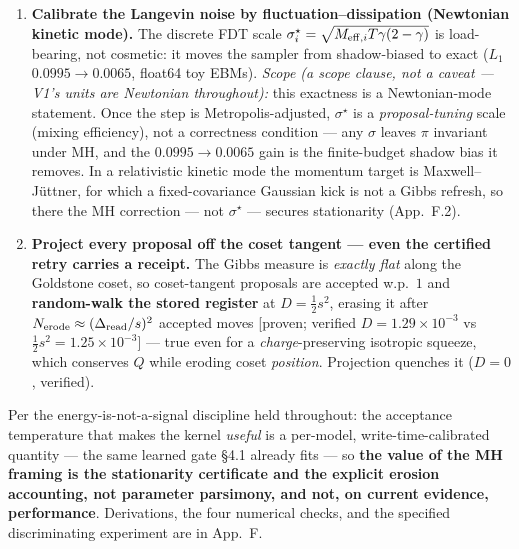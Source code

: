 \documentclass[11pt]{article}
\begin{document}
\begin{enumerate}
\item \textbf{Calibrate the Langevin noise by fluctuation--dissipation (Newtonian kinetic mode).} The discrete FDT scale $\sigma_i^\star=\sqrt{M_{{\rm eff},i}T\gamma(2-\gamma)}$ is load-bearing, not cosmetic: it moves the sampler from shadow-biased to exact ($L_1$ $0.0995\to0.0065$, float64 toy EBMs). \emph{Scope (a scope clause, not a caveat --- V1's units are Newtonian throughout):} this exactness is a Newtonian-mode statement. Once the step is Metropolis-adjusted, $\sigma^\star$ is a \emph{proposal-tuning} scale (mixing efficiency), not a correctness condition --- any $\sigma$ leaves $\pi$ invariant under MH, and the $0.0995\to0.0065$ gain is the finite-budget shadow bias it removes. In a relativistic kinetic mode the momentum target is Maxwell--J\"uttner, for which a fixed-covariance Gaussian kick is not a Gibbs refresh, so there the MH correction --- not $\sigma^\star$ --- secures stationarity (App.~F.2).
\item \textbf{Project every proposal off the coset tangent --- even the certified retry carries a receipt.} The Gibbs measure is \emph{exactly flat} along the Goldstone coset, so coset-tangent proposals are accepted w.p.\ $1$ and \textbf{random-walk the stored register} at $D=\tfrac12 s^2$, erasing it after $N_{\rm erode}\approx(\Delta_{\rm read}/s)^2$ accepted moves [proven; verified $D=1.29{\times}10^{-3}$ vs $\tfrac12 s^2=1.25{\times}10^{-3}$] --- true even for a \emph{charge}-preserving isotropic squeeze, which conserves $Q$ while eroding coset \emph{position}. Projection quenches it ($D=0$, verified).
\end{enumerate}
Per the energy-is-not-a-signal discipline held throughout: the acceptance temperature that makes the kernel \emph{useful} is a per-model, write-time-calibrated quantity --- the same learned gate \S4.1 already fits --- so \textbf{the value of the MH framing is the stationarity certificate and the explicit erosion accounting, not parameter parsimony, and not, on current evidence, performance}. Derivations, the four numerical checks, and the specified discriminating experiment are in App.~F.
\end{document}
